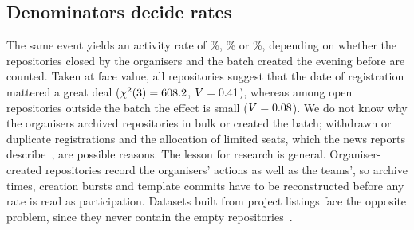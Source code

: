 \documentclass{article}
\begin{document}
\subsection{Denominators decide rates}
The same event yields an activity rate of \NRqOneActivePct\%, \NRqOneActiveOfOpenPct\% or \NRqOneActiveOfOpenNonbatchPct\%, depending on whether the repositories closed by the organisers and the batch created the evening before are counted. Taken at face value, all repositories suggest that the date of registration mattered a great deal ($\chi^2(\num{3}) = \num{608.2}$, $V = \num{0.41}$), whereas among open repositories outside the batch the effect is small ($V = \num{0.08}$). We do not know why the organisers archived repositories in bulk or created the batch; withdrawn or duplicate registrations and the allocation of limited seats, which the news reports describe~\cite{qumash2026queue,ulys2026survival}, are possible reasons. The lesson for research is general. Organiser-created repositories record the organisers' actions as well as the teams', so archive times, creation bursts and template commits have to be reconstructed before any rate is read as participation. Datasets built from project listings face the opposite problem, since they never contain the empty repositories~\cite{imam2021secretlife,mahmoud2022oneoff}.
\end{document}
